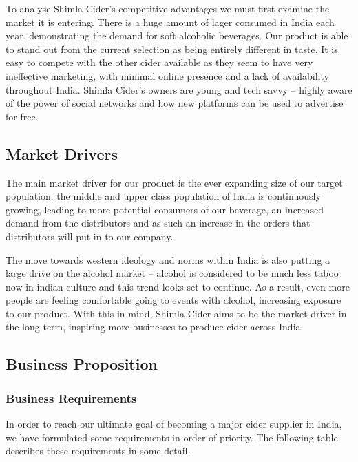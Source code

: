 \documentclass[11pt]{article}
\begin{document}
To analyse Shimla Cider's competitive advantages we must first examine the
market it is entering. There is a huge amount of lager consumed in India
each year, demonstrating the demand for soft alcoholic beverages. Our product
is able to stand out from the current selection as being entirely different
in taste. It is easy to compete with the other cider available as they seem
to have very ineffective marketing, with minimal online presence and a lack
of availability throughout India. Shimla Cider's owners are young and tech
savvy -- highly aware of the power of social networks and how new platforms
can be used to advertise for free.

\subsection{Market Drivers}

The main market driver for our product is the ever expanding size of our
target population: the middle and upper class population of India is
continuously growing, leading to more potential consumers of our beverage,
an increased demand from the distributors and as such an increase in the
orders that distributors will put in to our company.

The move towards western ideology and norms within India is also putting a
large drive on the alcohol market -- alcohol is considered to be much less
taboo now in indian culture and this trend looks set to continue. As a
result, even more people are feeling comfortable going to events with
alcohol, increasing exposure to our product. With this in mind, Shimla Cider
aims to be the market driver in the long term, inspiring more businesses to
produce cider across India.

  \subsection{Business Proposition}

  \subsubsection{Business Requirements}
In order to reach our ultimate goal of becoming a major cider supplier in
India, we have formulated some requirements in order of priority. The following
table describes these requirements in some detail.
\end{document}
